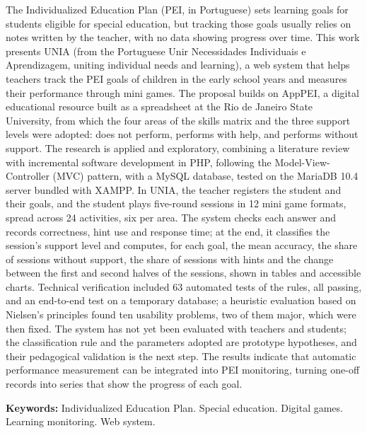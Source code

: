 
\noindent The Individualized Education Plan (PEI, in Portuguese) sets learning goals for students eligible for special education, but tracking those goals usually relies on notes written by the teacher, with no data showing progress over time. This work presents UNIA (from the Portuguese Unir Necessidades Individuais e Aprendizagem, uniting individual needs and learning), a web system that helps teachers track the PEI goals of children in the early school years and measures their performance through mini games. The proposal builds on AppPEI, a digital educational resource built as a spreadsheet at the Rio de Janeiro State University, from which the four areas of the skills matrix and the three support levels were adopted: does not perform, performs with help, and performs without support. The research is applied and exploratory, combining a literature review with incremental software development in PHP, following the Model-View-Controller (MVC) pattern, with a MySQL database, tested on the MariaDB 10.4 server bundled with XAMPP. In UNIA, the teacher registers the student and their goals, and the student plays five-round sessions in 12 mini game formats, spread across 24 activities, six per area. The system checks each answer and records correctness, hint use and response time; at the end, it classifies the session's support level and computes, for each goal, the mean accuracy, the share of sessions without support, the share of sessions with hints and the change between the first and second halves of the sessions, shown in tables and accessible charts. Technical verification included 63 automated tests of the rules, all passing, and an end-to-end test on a temporary database; a heuristic evaluation based on Nielsen’s principles found ten usability problems, two of them major, which were then fixed. The system has not yet been evaluated with teachers and students; the classification rule and the parameters adopted are prototype hypotheses, and their pedagogical validation is the next step. The results indicate that automatic performance measurement can be integrated into PEI monitoring, turning one-off records into series that show the progress of each goal.

\vspace{\baselineskip}
\noindent\textbf{Keywords:} Individualized Education Plan. Special education. Digital games. Learning monitoring. Web system.
